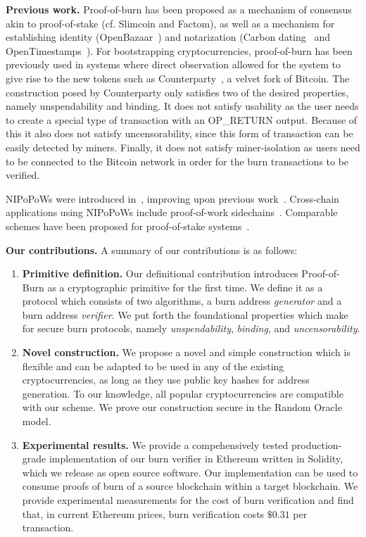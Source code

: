 \noindent
\textbf{Previous work.}
Proof-of-burn has been proposed as a mechanism of consensus akin to
proof-of-stake (cf. Slimcoin and Factom), as well as a mechanism for
establishing identity (OpenBazaar~\cite{zindros2016trust}) and notarization
(Carbon dating~\cite{clark2012commitcoin} and
OpenTimestamps~\cite{todd2016opentimestamps}). For bootstrapping
cryptocurrencies, proof-of-burn has been previously used in systems where direct
observation allowed for the system to give rise to the new tokens such as
Counterparty~\cite{counterparty}, a velvet fork of Bitcoin. The construction posed by Counterparty only satisfies two of the desired properties, namely unspendability and binding. It does not satisfy usability as the user needs to create a special type of transaction with an \textsf{OP\_RETURN} output. Because of this it also does not satisfy uncensorability, since this form of transaction can be easily detected by miners. Finally, it does not satisfy miner-isolation as users need to be connected to the Bitcoin network in order for the burn transactions to be verified.

NIPoPoWs were introduced in~\cite{nipopows}, improving upon previous
work~\cite{popow,highway}. Cross-chain applications using NIPoPoWs include
proof-of-work sidechains~\cite{pow-sidechains}. Comparable schemes have been
proposed for proof-of-stake systems~\cite{pos-sidechains}.

\noindent
\textbf{Our contributions.}
A summary of our contributions is as follows:
\begin{enumerate}[wide, labelwidth=!, labelindent=0pt, label=(\roman*)]
    \item \textbf{Primitive definition.} Our definitional contribution introduces Proof-of-Burn as a cryptographic primitive for the first time. We
    define it as a protocol which consists of two algorithms, a burn address \emph{generator} and a burn address \emph{verifier}. We put forth the foundational properties which make for secure burn protocols, namely \emph{unspendability}, \emph{binding}, and \emph{uncensorability}.
    \item \textbf{Novel construction.} We propose a novel and simple construction which is flexible and can be adapted to be used in any of the
    existing cryptocurrencies, as long as they use public key hashes for address generation. To our knowledge, all popular cryptocurrencies are
    compatible with our scheme. We prove our construction secure in the Random Oracle model.
    \item \textbf{Experimental results.} We provide a compehensively tested production-grade implementation of our burn verifier in Ethereum
    written in Solidity, which we release as open source software. Our implementation can be used to consume proofs of burn of a source blockchain
    within a target blockchain. We provide experimental measurements for the cost of burn verification and find that, in current Ethereum prices,
    burn verification costs $\$0.31$ per transaction.
\end{enumerate}

